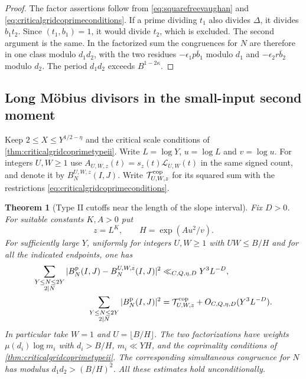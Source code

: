 \documentclass[11pt,a4paper]{article}
\numberwithin{equation}{section}
\newtheorem{theorem}{Theorem}[section]
\begin{document}
\begin{proof}
The factor assertions follow from
\cref{eq:squarefreevaughan} and
\cref{eq:criticalgridcoprimeconditions}. If a prime
dividing $t_1$ also divides $\Delta$, it divides
$b_1t_2$. Since $(t_1,b_1)=1$, it would divide
$t_2$, which is excluded. The second argument is
the same. In the factorized sum the congruences
for $N$ are therefore in one class modulo $d_1d_2$,
with the two residues $-\epsilon_1p\overline b_1$
modulo $d_1$ and $-\epsilon_2r\overline b_2$ modulo
$d_2$. The period $d_1d_2$ exceeds $B^{1-2\kappa}$.
\end{proof}

\subsection{Long M\"obius divisors in the small-input second moment}

Keep $2\le X\le Y^{1/2-\eta}$ and the critical scale
conditions of \cref{thm:criticalgridcoprimetypeii}.
Write $L=\log Y$, $u=\log L$ and $v=\log u$.
For integers $U,W\ge1$ use
$A_{U,W,z}(t)=s_z(t)\mathcal L_{U,W}(t)$ in the same
signed count, and denote it by $B_N^{U,W,z}(I,J)$.
Write $\mathcal T_{U,W,z}^{\rm cop}$ for its squared
sum with the restrictions \cref{eq:criticalgridcoprimeconditions}.

\begin{theorem}[Type II cutoffs near the length of the slope interval]
\label{thm:criticalgridlongmobius}
Fix $D>0$. For suitable constants $K,A>0$ put
\[
 z=L^K,\qquad H=\exp(Au^2/v).
\]
For sufficiently large $Y$, uniformly for integers
$U,W\ge1$ with $UW\le B/H$ and for all the indicated
endpoints, one has
\begin{align}
 \sum_{\substack{Y\le N\le2Y\\2\mid N}}
       |B_N^{\rm p}(I,J)-B_N^{U,W,z}(I,J)|^2
       &\ll_{C,Q,\eta,D} Y^3 L^{-D},
       \label{eq:criticalgridlongmobiuserror}\\
 \sum_{\substack{Y\le N\le2Y\\2\mid N}} |B_N^{\rm p}(I,J)|^2
       &=\mathcal T_{U,W,z}^{\rm cop}
                    +O_{C,Q,\eta,D}(Y^3 L^{-D}).
       \label{eq:criticalgridlongmobiusmoment}
\end{align}
In particular take $W=1$ and $U=\lfloor B/H\rfloor$.
The two factorizations have weights $\mu(d_i)\log m_i$
with $d_i>B/H$, $m_i\ll YH$, and the coprimality
conditions of \cref{thm:criticalgridcoprimetypeii}.
The corresponding simultaneous congruence for $N$
has modulus $d_1d_2>(B/H)^2$. All these estimates
hold unconditionally.
\end{theorem}
\end{document}
